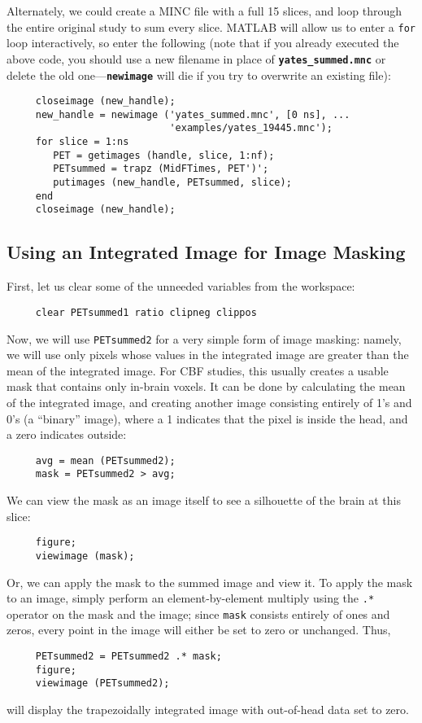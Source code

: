 \documentclass[11pt]{article}
\def\code#1{{\tt \bf #1}}
\begin{document}
Alternately, we could create a MINC file with a full 15 slices, and
loop through the entire original study to sum every slice.  MATLAB
will allow us to enter a \verb|for| loop interactively, so enter the
following (note that if you already executed the above code, you
should use a new filename in place of \code{yates\_summed.mnc} or
delete the old one---\code{newimage} will die if you try to overwrite
an existing file):
\begin{verbatim}
     closeimage (new_handle);
     new_handle = newimage ('yates_summed.mnc', [0 ns], ...
                            'examples/yates_19445.mnc');
     for slice = 1:ns
        PET = getimages (handle, slice, 1:nf);
        PETsummed = trapz (MidFTimes, PET')';
        putimages (new_handle, PETsummed, slice);
     end
     closeimage (new_handle);
\end{verbatim}

\subsection{Using an Integrated Image for Image Masking}

First, let us clear some of the unneeded variables from the workspace:
\begin{verbatim}
     clear PETsummed1 ratio clipneg clippos
\end{verbatim}

Now, we will use \verb|PETsummed2| for a very simple form of image
masking: namely, we will use only pixels whose values in the
integrated image are greater than the mean of the integrated image.
For CBF studies, this usually creates a usable mask that contains only
in-brain voxels.  It can be done by calculating the mean of the
integrated image, and creating another image consisting entirely of
1's and 0's (a ``binary'' image), where a 1 indicates that the pixel
is inside the head, and a zero indicates outside:
\begin{verbatim}
     avg = mean (PETsummed2);
     mask = PETsummed2 > avg;
\end{verbatim}

We can view the mask as an image itself to see a silhouette of the
brain at this slice:
\begin{verbatim}
     figure;
     viewimage (mask);
\end{verbatim}
Or, we can apply the mask to the summed image and view it.  To apply
the mask to an image, simply perform an element-by-element multiply 
using the
\verb|.*| operator on the mask and the image; since \verb|mask|
consists entirely of ones and zeros, every point in the image will
either be set to zero or unchanged.  Thus,
\begin{verbatim}
     PETsummed2 = PETsummed2 .* mask;
     figure;
     viewimage (PETsummed2);
\end{verbatim}
will display the trapezoidally integrated image with out-of-head data
set to zero.
\end{document}
